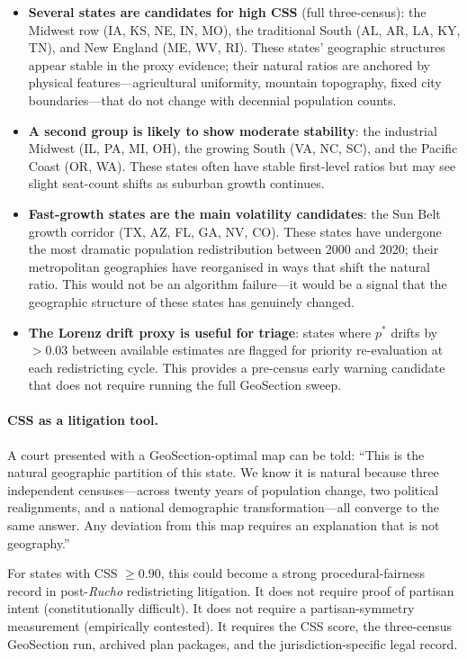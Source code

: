 \begin{itemize}
\item \textbf{Several states are candidates for high CSS} (full three-census):
  the Midwest row (IA, KS, NE, IN, MO), the traditional South (AL, AR, LA, KY,
  TN), and New England (ME, WV, RI).
  These states' geographic structures appear stable in the proxy evidence; their
  natural ratios are anchored by physical features---agricultural uniformity,
  mountain topography, fixed city boundaries---that do not change with
  decennial population counts.

\item \textbf{A second group is likely to show moderate stability}:
  the industrial Midwest (IL, PA, MI, OH), the growing South (VA, NC, SC),
  and the Pacific Coast (OR, WA).
  These states often have stable first-level ratios but may see slight seat-count
  shifts as suburban growth continues.

\item \textbf{Fast-growth states are the main volatility candidates}:
  the Sun Belt growth corridor (TX, AZ, FL, GA, NV, CO).
  These states have undergone the most dramatic population redistribution
  between 2000 and 2020; their metropolitan geographies have reorganised in
  ways that shift the natural ratio.
  This would not be an algorithm failure---it would be a signal that the geographic
  structure of these states has genuinely changed.

\item \textbf{The Lorenz drift proxy is useful for triage}:
  states where $p^*$ drifts by $>0.03$ between available estimates are
  flagged for priority re-evaluation at each redistricting cycle.
  This provides a pre-census early warning candidate that does not require
  running the full GeoSection sweep.
\end{itemize}

\paragraph{CSS as a litigation tool.}
A court presented with a GeoSection-optimal map can be told: ``This is the
natural geographic partition of this state.
We know it is natural because three independent censuses---across twenty years
of population change, two political realignments, and a national demographic
transformation---all converge to the same answer.
Any deviation from this map requires an explanation that is not geography.''

For states with CSS $\geq 0.90$, this could become a strong procedural-fairness
record in post-\emph{Rucho} redistricting litigation.
It does not require proof of partisan intent (constitutionally difficult).
It does not require a partisan-symmetry measurement (empirically contested).
It requires the CSS score, the three-census GeoSection run, archived plan
packages, and the jurisdiction-specific legal record.

